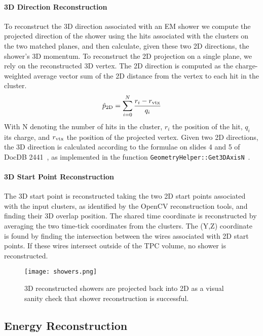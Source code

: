 \documentclass[a4paper]{article}
\begin{document}
\paragraph{3D Direction Reconstruction} To reconstruct the 3D direction associated with an EM shower we compute the projected direction of the shower using the hits associated with the clusters on the two matched planes, and then calculate, given these two 2D directions, the shower's 3D momentum. To reconstruct the 2D projection on a single plane, we rely on the reconstructed 3D vertex. The 2D direction is computed as the charge-weighted average vector sum of the 2D distance from the vertex to each hit in the cluster.
\begin{equation}
  \hat{p}_{\rm 2D} = \sum_{i=0}^{N} \frac{ r_i - r_{\rm vtx} } { q_i }
\end{equation}
With N denoting the number of hits in the cluster, $r_i$ the position of the hit, $q_i$ its charge, and $r_{\rm vtx}$ the position of the projected vertex. Given two 2D directions, the 3D direction is calculated according to the formulae on slides 4 and 5 of DocDB 2441~\cite{bib:2441}, as implemented in the function \texttt{GeometryHelper::Get3DAxisN}~\cite{bib:larliteGeoHelper}.

\paragraph{3D Start Point Reconstruction}The 3D start point is reconstructed taking the two 2D start points associated with the input clusters, as identified by the OpenCV reconstruction tools, and finding their 3D overlap position. The shared time coordinate is reconstructed by averaging the two time-tick coordinates from the clusters. The (Y,Z) coordinate is found by finding the intersection between the wires associated with 2D start points. If these wires intersect outside of the TPC volume, no shower is reconstructed.

\begin{figure}[H]
\centering
\texttt{[image: showers.png]}
\caption{3D reconstructed showers are projected back into 2D as a visual sanity check that shower reconstruction is successful.}
\label{fig:showers}
\end{figure}

\subsection{Energy Reconstruction}
\label{sec:ereco}
\end{document}
